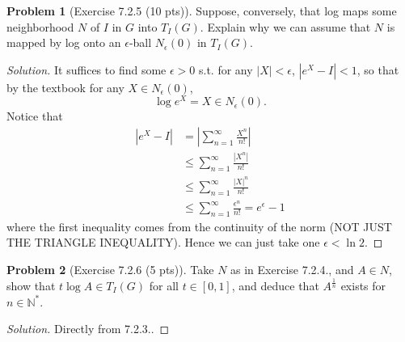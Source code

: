 \documentclass{article}
\theoremstyle{definition}
\newtheorem{problem}{Problem}
\theoremstyle{plain}
\begin{document}
\begin{problem}[Exercise 7.2.5 (10 pts)]
Suppose, conversely, that log maps some neighborhood $N$ of $I$ in $G$ into $T_I(G)$. Explain why we can assume that $N$ is mapped by log onto an $\epsilon$-ball $N_\epsilon(0)$ in $T_I(G)$.
\end{problem}
\begin{adjustwidth}{0.7cm}{}
\color{blue}
\begin{proof}[Solution]
It suffices to find some $\epsilon>0$ s.t. for any $|X|<\epsilon$, $|e^X-I|<1$, so that by the textbook for any $X\in N_\epsilon(0)$,
\begin{displaymath}
\log e^X=X\in N_\epsilon(0).
\end{displaymath}
Notice that
\begin{align*}
|e^X-I|&=\left|\sum_{n=1}^{\infty}\frac{X^n}{n!}\right|\\
&\leq\sum_{n=1}^{\infty}\frac{|X^n|}{n!}\\
&\leq\sum_{n=1}^{\infty}\frac{|X|^n}{n!}\\
&\leq\sum_{n=1}^{\infty}\frac{\epsilon^n}{n!}=e^\epsilon-1
\end{align*}
where the first inequality comes from the continuity of the norm (NOT JUST THE TRIANGLE INEQUALITY). Hence we can just take one $\epsilon<\ln2$.
\color{black}
\end{proof}
\end{adjustwidth}

\begin{problem}[Exercise 7.2.6 (5 pts)]
Take $N$ as in Exercise 7.2.4., and $A\in N$, show that $t\log A\in T_I(G)$ for all $t\in[0,1]$, and deduce that $A^{\frac{1}{n}}$ exists for $n\in\mathbb{N}^*$.
\end{problem}
\begin{adjustwidth}{0.7cm}{}
\color{blue}
\begin{proof}[Solution]
Directly from 7.2.3..
\color{black}
\end{proof}
\end{adjustwidth}
\end{document}
